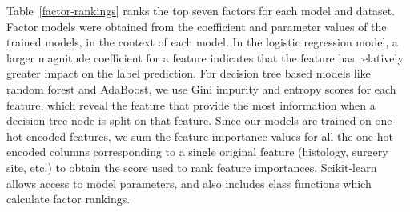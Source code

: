 \documentclass[review]{elsarticle}
\begin{document}
Table~\ref{factor-rankings} ranks the top seven factors for each model and dataset. Factor models were obtained from the coefficient and parameter values of the trained models, in the context of each model. In the logistic regression model, a larger magnitude coefficient for a feature indicates that the feature has relatively greater impact on the label prediction. For decision tree based models like random forest and AdaBoost, we use Gini impurity and entropy scores for each feature, which reveal the feature that provide the most information when a decision tree node is split on that feature. Since our models are trained on one-hot encoded features, we sum the feature importance values for all the one-hot encoded columns corresponding to a single original feature (histology, surgery site, etc.) to obtain the score used to rank feature importances. Scikit-learn allows access to model parameters, and also includes class functions which calculate factor rankings.
\end{document}
